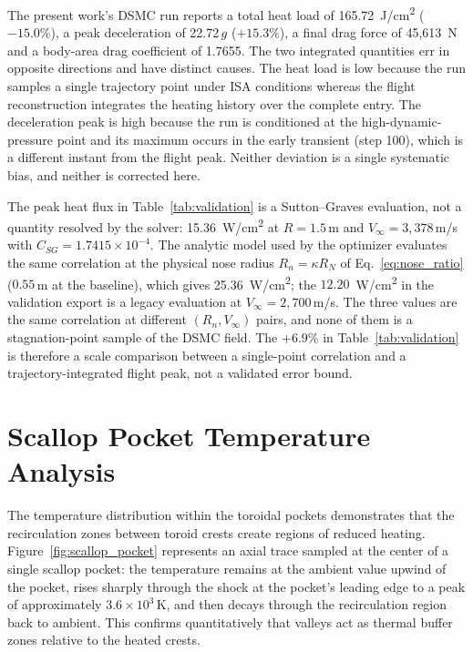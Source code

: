 The present work's DSMC run reports a total heat load of 165.72~J/cm\textsuperscript{2} ($-15.0\%$), a peak deceleration of 22.72\,$g$ ($+15.3\%$), a final drag force of 45{,}613~N and a body-area drag coefficient of 1.7655. The two integrated quantities err in opposite directions and have distinct causes. The heat load is low because the run samples a single trajectory point under ISA conditions whereas the flight reconstruction integrates the heating history over the complete entry. The deceleration peak is high because the run is conditioned at the high-dynamic-pressure point and its maximum occurs in the early transient (step 100), which is a different instant from the flight peak. Neither deviation is a single systematic bias, and neither is corrected here.

The peak heat flux in Table~\ref{tab:validation} is a Sutton--Graves evaluation, not a quantity resolved by the solver: 15.36~W/cm\textsuperscript{2} at $R=1.5$\,m and $V_{\infty}=3{,}378$\,m/s with $C_{SG}=1.7415\times10^{-4}$. The analytic model used by the optimizer evaluates the same correlation at the physical nose radius $R_n=\kappa R_N$ of Eq.~\eqref{eq:nose_ratio} ($0.55$\,m at the baseline), which gives 25.36~W/cm\textsuperscript{2}; the $12.20$~W/cm\textsuperscript{2} in the validation export is a legacy evaluation at $V_{\infty}=2{,}700$\,m/s. The three values are the same correlation at different $(R_n,V_{\infty})$ pairs, and none of them is a stagnation-point sample of the DSMC field. The $+6.9\%$ in Table~\ref{tab:validation} is therefore a scale comparison between a single-point correlation and a trajectory-integrated flight peak, not a validated error bound.

\section{Scallop Pocket Temperature Analysis}
The temperature distribution within the toroidal pockets demonstrates that the recirculation zones between toroid crests create regions of reduced heating. Figure~\ref{fig:scallop_pocket} represents an axial trace sampled at the center of a single scallop pocket: the temperature remains at the ambient value upwind of the pocket, rises sharply through the shock at the pocket's leading edge to a peak of approximately $3.6 \times 10^3$\,K, and then decays through the recirculation region back to ambient. This confirms quantitatively that valleys act as thermal buffer zones relative to the heated crests.


